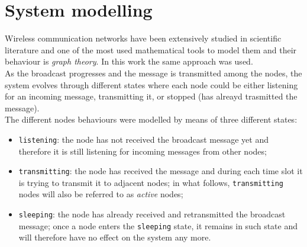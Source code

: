 %
\chapter{System modelling}
\label{ch:modelling}
Wireless communication networks have been extensively studied in scientific
literature and one of the most used mathematical tools to model them and their
behaviour is \textit{graph theory}. In this work the same approach was used.\\
As the broadcast progresses and the message is transmitted among the nodes, the
system evolves through different states where each node could be either listening
for an incoming message, transmitting it, or stopped (has alreayd trasmitted the
message).\\
The different nodes behaviours were modelled by means
of three different states:
\begin{itemize}
	\item \texttt{listening}: the node has not received the broadcast message
	yet and therefore it is still listening for incoming messages from other nodes;
	\item \texttt{transmitting}: the node has received the message and during
	each time slot it is trying to transmit it to adjacent nodes; in what
	follows, \texttt{transmitting} nodes will also be referred to as
	\textit{active} nodes;
	\item \texttt{sleeping}: the node has already received and retransmitted
	the broadcast message; once a node enters the \texttt{sleeping} state, it
	remains in such state and will therefore have no effect on the system
	any more.
\end{itemize}
